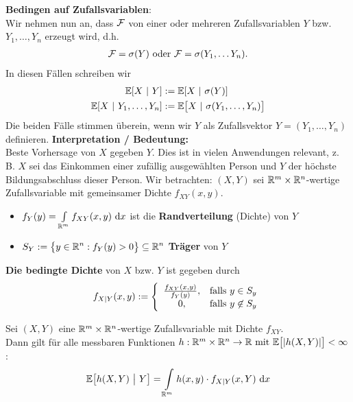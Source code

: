 \textbf{Bedingen auf Zufallsvariablen}:\\
Wir nehmen nun an, dass $\mathcal{F}$ von einer oder mehreren Zufallsvariablen $Y$ bzw. $Y_1,\ldots, Y_n$ erzeugt wird, d.h.
\begin{align*}
	\mathcal{F}=\sigma(Y)\text{ oder }\mathcal{F}=\sigma(Y_1,\ldots Y_n).
\end{align*}
In diesen Fällen schreiben wir 
\begin{align*}
	\mathbb{E}[X~|~Y]&:=\mathbb{E}[X~|~\sigma(Y)]\\
	\mathbb{E}[X~|~Y_1,\ldots,Y_n]&:=\mathbb{E}\big[X~|~\sigma(Y_1,\ldots,Y_n)\big]
\end{align*}
Die beiden Fälle stimmen überein, wenn wir $Y$ als Zufallsvektor $Y=(Y_1,\ldots,Y_n)$ definieren.\nl
\textbf{Interpretation / Bedeutung:}\\
Beste Vorhersage von $X$ gegeben $Y$. Dies ist in vielen Anwendungen relevant, z. B. $X$ sei das Einkommen einer zufällig ausgewählten Person und $Y$ der höchste Bildungsabschluss dieser Person.\nl
Wir betrachten: $(X,Y)$ sei $\mathbb{R}^m\times\mathbb{R}^n$-wertige Zufallsvariable mit gemeinsamer Dichte $f_{XY}(x,y)$.
\begin{itemize}
	\item
	$ f_Y(y)=\int\limits_{\mathbb{R}^m}f_{XY}(x,y)\text{ d} x $ ist die \textbf{Randverteilung} (Dichte) von $Y$
	\item 
	$\begin{aligned}
		S_Y:=\big\lbrace y\in\mathbb{R}^n:f_Y(y)>0\big\rbrace\subseteq\mathbb{R}^n
	\end{aligned}$ \textbf{Träger} von $Y$
\end{itemize}

\begin{defi} %
	\textbf{Die bedingte Dichte} von $X$ bzw. $Y$ ist gegeben durch 
	\begin{align*}
		f_{X|Y}(x,y):=\left\lbrace\begin{array}{cl}
			\frac{f_{XY}(x,y)}{f_Y(y)}, &\text{falls } y\in S_y\\
			0, &\text{falls } y\not\in S_y
		\end{array}\right.
	\end{align*}
\end{defi}

\begin{theorem} %
	Sei $(X,Y)$ eine $\mathbb{R}^m\times\mathbb{R}^n$-wertige Zufallsvariable mit Dichte $f_{XY}$.\\
	Dann gilt für alle messbaren Funktionen $h:\mathbb{R}^m\times\mathbb{R}^n\to\mathbb{R}\text{ mit }\mathbb{E}\big[|h(X,Y)|\big]<\infty$:
	\begin{align*}
		\mathbb{E}\big[ h(X,Y)~\big|~Y\big]=\int\limits_{\mathbb{R}^m} h(x,y)\cdot f_{X|Y}(x,Y)\text{ d} x
	\end{align*}
\end{theorem}

